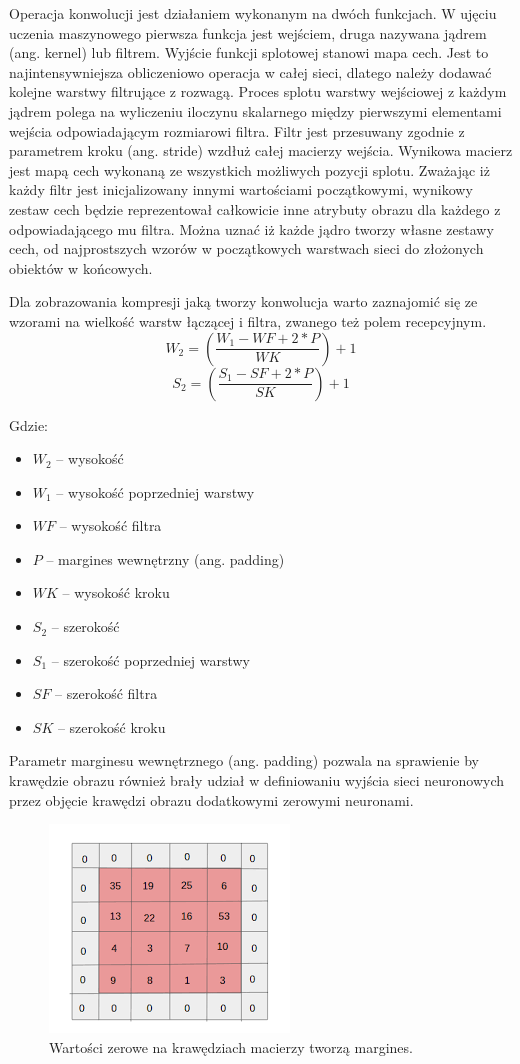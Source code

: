 \documentclass[12pt,a4paper,twoside,titlepage,openright]{book}
\begin{document}
Operacja konwolucji jest działaniem wykonanym na dwóch funkcjach. W ujęciu uczenia maszynowego pierwsza funkcja jest wejściem, druga nazywana jądrem (ang. kernel) lub filtrem. Wyjście funkcji splotowej stanowi mapa cech. Jest to najintensywniejsza obliczeniowo operacja w całej sieci, dlatego należy dodawać kolejne warstwy filtrujące z rozwagą. Proces splotu warstwy wejściowej z każdym jądrem polega na wyliczeniu iloczynu skalarnego między pierwszymi elementami wejścia odpowiadającym rozmiarowi filtra. Filtr jest przesuwany zgodnie z parametrem kroku (ang. stride) wzdłuż całej macierzy wejścia. Wynikowa macierz jest mapą cech wykonaną ze wszystkich możliwych pozycji splotu. Zważając iż każdy filtr jest inicjalizowany innymi wartościami początkowymi, wynikowy zestaw cech będzie reprezentował całkowicie inne atrybuty obrazu dla każdego z odpowiadającego mu filtra. Można uznać iż każde jądro tworzy własne zestawy cech, od najprostszych wzorów w początkowych warstwach sieci do złożonych obiektów w końcowych.

Dla zobrazowania kompresji jaką tworzy konwolucja warto zaznajomić się ze wzorami na wielkość warstw łączącej i filtra, zwanego też polem recepcyjnym.
$$ W_2 = (\frac{W_1 - WF + 2 * P}{WK}) + 1 $$ 
$$ S_2 = (\frac{S_1 - SF + 2 * P}{SK}) + 1 $$

Gdzie:
\begin{itemize}
\item $W_2$ -- wysokość
\item $W_1$ -- wysokość poprzedniej warstwy
\item $WF$ -- wysokość filtra
\item $P$ -- margines wewnętrzny (ang. padding)
\item $WK$ -- wysokość kroku
\item $S_2$ -- szerokość
\item $S_1$ -- szerokość poprzedniej warstwy
\item $SF$ -- szerokość filtra
\item $SK$ -- szerokość kroku
\end{itemize}

Parametr marginesu wewnętrznego (ang. padding) pozwala na sprawienie by krawędzie obrazu również brały udział w definiowaniu wyjścia sieci neuronowych przez objęcie krawędzi obrazu dodatkowymi zerowymi neuronami. 

\begin{figure}[ht]
	\centering
			\includegraphics[resolution=100]{Padding.png}
		\caption{Wartości zerowe na krawędziach macierzy tworzą margines.}
\end{figure}
\end{document}
